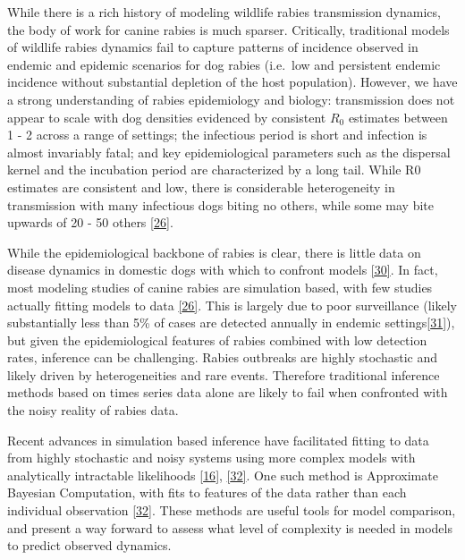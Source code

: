 \documentclass[
  oneside]{book}
\begin{document}
While there is a rich history of modeling wildlife rabies transmission dynamics, the body of work for canine rabies is much sparser. Critically, traditional models of wildlife rabies dynamics fail to capture patterns of incidence observed in endemic and epidemic scenarios for dog rabies (i.e.~low and persistent endemic incidence without substantial depletion of the host population). However, we have a strong understanding of rabies epidemiology and biology: transmission does not appear to scale with dog densities evidenced by consistent \(R_{0}\) estimates between 1 - 2 across a range of settings; the infectious period is short and infection is almost invariably fatal; and key epidemiological parameters such as the dispersal kernel and the incubation period are characterized by a long tail. While R0 estimates are consistent and low, there is considerable heterogeneity in transmission with many infectious dogs biting no others, while some may bite upwards of 20 - 50 others \protect\hyperlink{ref-rajeev2020modeling}{{[}26{]}}.

While the epidemiological backbone of rabies is clear, there is little data on disease dynamics in domestic dogs with which to confront models \protect\hyperlink{ref-scott2017}{{[}30{]}}. In fact, most modeling studies of canine rabies are simulation based, with few studies actually fitting models to data \protect\hyperlink{ref-rajeev2020modeling}{{[}26{]}}. This is largely due to poor surveillance (likely substantially less than 5\% of cases are detected annually in endemic settings\protect\hyperlink{ref-townsend2013a}{{[}31{]}}), but given the epidemiological features of rabies combined with low detection rates, inference can be challenging. Rabies outbreaks are highly stochastic and likely driven by heterogeneities and rare events. Therefore traditional inference methods based on times series data alone are likely to fail when confronted with the noisy reality of rabies data.

Recent advances in simulation based inference have facilitated fitting to data from highly stochastic and noisy systems using more complex models with analytically intractable likelihoods \protect\hyperlink{ref-funk2020}{{[}16{]}}, \protect\hyperlink{ref-hazelbag2020}{{[}32{]}}. One such method is Approximate Bayesian Computation, with fits to features of the data rather than each individual observation \protect\hyperlink{ref-hazelbag2020}{{[}32{]}}. These methods are useful tools for model comparison, and present a way forward to assess what level of complexity is needed in models to predict observed dynamics.
\end{document}
